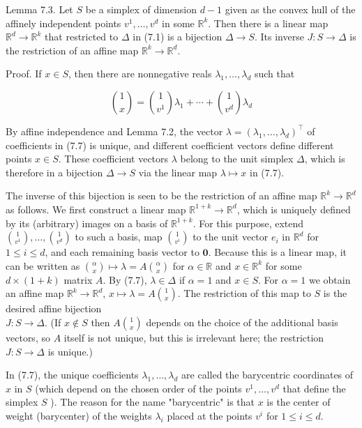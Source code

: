 \documentclass[12pt]{article}
\begin{document}
Lemma 7.3. Let $S$ be a simplex of dimension $d-1$ given as the convex hull of the affinely independent points $v^{1}, \ldots, v^{d}$ in some $\mathbb{R}^{k}$. Then there is a linear map $\mathbb{R}^{d} \rightarrow \mathbb{R}^{k}$ that restricted to $\Delta$ in (7.1) is a bijection $\Delta \rightarrow S$. Its inverse $J: S \rightarrow \Delta$ is the restriction of an affine map $\mathbb{R}^{k} \rightarrow \mathbb{R}^{d}$.

Proof. If $x \in S$, then there are nonnegative reals $\lambda_{1}, \ldots, \lambda_{d}$ such that


\begin{equation*}
\binom{1}{x}=\binom{1}{v^{1}} \lambda_{1}+\cdots+\binom{1}{v^{d}} \lambda_{d} \tag{7.7}
\end{equation*}


By affine independence and Lemma 7.2, the vector $\lambda=\left(\lambda_{1}, \ldots, \lambda_{d}\right)^{\top}$ of coefficients in (7.7) is unique, and different coefficient vectors define different points $x \in S$. These coefficient vectors $\lambda$ belong to the unit simplex $\Delta$, which is therefore in a bijection $\Delta \rightarrow S$ via the linear map $\lambda \mapsto x$ in (7.7).

The inverse of this bijection is seen to be the restriction of an affine map $\mathbb{R}^{k} \rightarrow \mathbb{R}^{d}$ as follows. We first construct a linear map $\mathbb{R}^{1+k} \rightarrow \mathbb{R}^{d}$, which is uniquely defined by its (arbitrary) images on a basis of $\mathbb{R}^{1+k}$. For this purpose, extend $\binom{1}{v^{1}}, \ldots,\binom{1}{v^{d}}$ to such a basis, map $\binom{1}{v^{i}}$ to the unit vector $e_{i}$ in $\mathbb{R}^{d}$ for $1 \leq i \leq d$, and each remaining basis vector to $\mathbf{0}$. Because this is a linear map, it can be written as $\binom{\alpha}{x} \mapsto \lambda=A\binom{\alpha}{x}$ for $\alpha \in \mathbb{R}$ and $x \in \mathbb{R}^{k}$ for some $d \times(1+k)$ matrix $A$. By (7.7), $\lambda \in \Delta$ if $\alpha=1$ and $x \in S$. For $\alpha=1$ we obtain an affine map $\mathbb{R}^{k} \rightarrow \mathbb{R}^{d}$, $x \mapsto \lambda=A\binom{1}{x}$. The restriction of this map to $S$ is the desired affine bijection\\
$J: S \rightarrow \Delta$. (If $x \notin S$ then $A\binom{1}{x}$ depends on the choice of the additional basis vectors, so $A$ itself is not unique, but this is irrelevant here; the restriction $J: S \rightarrow \Delta$ is unique.)

In (7.7), the unique coefficients $\lambda_{1}, \ldots, \lambda_{d}$ are called the barycentric coordinates of $x$ in $S$ (which depend on the chosen order of the points $v^{1}, \ldots, v^{d}$ that define the simplex $S$ ). The reason for the name "barycentric" is that $x$ is the center of weight (barycenter) of the weights $\lambda_{i}$ placed at the points $v^{i}$ for $1 \leq i \leq d$.
\end{document}
